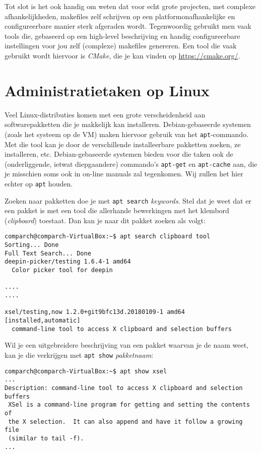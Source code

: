 \documentclass[a4paper,twoside,openany]{memoir}
\begin{document}
Tot slot is het ook handig om weten dat voor echt grote projecten, met complexe
afhankelijkheden, makefiles zelf schrijven op een platformonafhankelijke en
configureerbare manier sterk afgeraden wordt. Tegenwoordig gebruikt men vaak
tools die, gebaseerd op een high-level beschrijving en handig configureerbare
instellingen voor jou zelf (complexe) makefiles genereren. Een tool die vaak
gebruikt wordt hiervoor is \emph{CMake}, die je kan vinden op
\url{https://cmake.org/}.

\chapter{Administratietaken op Linux}

Veel Linux-distributies komen met een grote verscheidenheid aan
softwarepakketten die je makkelijk kan installeren. Debian-gebaseerde systemen
(zoals het systeem op de VM) maken hiervoor gebruik van het \verb!apt!-commando.
Met die tool kan je door de verschillende installeerbare pakketten zoeken, ze
installeren, etc. Debian-gebaseerde systemen bieden voor die taken ook de
(onderliggende, ietwat diepgaandere) commando's \verb!apt-get! en
\verb!apt-cache! aan, die je misschien soms ook in on-line manuals zal
tegenkomen. Wij zullen het hier echter op \verb!apt! houden.

Zoeken naar pakketten doe je met \verb!apt search! \emph{keywords}. Stel dat je
weet dat er een pakket is met een tool die allerhande bewerkingen met het
klembord (\emph{clipboard}) toestaat. Dan kan je naar dit pakket zoeken als
volgt:
\begin{verbatim}
comparch@comparch-VirtualBox:~$ apt search clipboard tool
Sorting... Done
Full Text Search... Done
deepin-picker/testing 1.6.4-1 amd64
  Color picker tool for deepin

....
....

xsel/testing,now 1.2.0+git9bfc13d.20180109-1 amd64 [installed,automatic]
  command-line tool to access X clipboard and selection buffers
\end{verbatim}

Wil je een uitgebreidere beschrijving van een pakket waarvan je de naam weet,
kan je die verkrijgen met \verb!apt show! \emph{pakketnaam}:

\begin{verbatim}
comparch@comparch-VirtualBox:~$ apt show xsel
...
Description: command-line tool to access X clipboard and selection buffers
 XSel is a command-line program for getting and setting the contents of
 the X selection.  It can also append and have it follow a growing file
 (similar to tail -f).
...
\end{verbatim}
\end{document}
